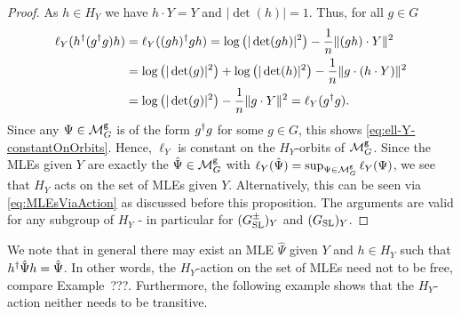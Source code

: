 \begin{proof}
	As $h \in H_Y$ we have $h \cdot Y = Y$ and $|\det(h)| = 1$. Thus, for all $g \in G$
	\begin{align*}
		\ell_Y(h^{\dagger}( g^{\dagger} g) h) &= \ell_{Y}((gh)^{\dagger} gh) = \log \big( |\det(gh)|^2 \big) - \frac{1}{n} \| (gh) \cdot Y \|^2 \\
		&= \log \big( |\det(g)|^2 \big) + \log \big( |\det(h)|^2 \big) - \frac{1}{n} \| g \cdot (h \cdot Y) \|^2 \\
		&= \log \big( |\det(g)|^2 \big) - \frac{1}{n} \| g \cdot Y \|^2 = \ell_{Y}(g^{\dagger} g).
	\end{align*}
	Since any $\Psi \in \mathcal{M}^{\mathtt{g}}_G$ is of the form $g^{\dagger} g$ for some $g \in G$, this shows \eqref{eq:ell-Y-constantOnOrbits}.
	Hence, $\ell_Y$ is constant on the $H_Y$-orbits of $\mathcal{M}^{\mathtt{g}}_G$. Since the MLEs given $Y$ are exactly the $\hat{\Psi} \in \mathcal{M}^{\mathtt{g}}_G$ with $\ell_{Y}(\hat{\Psi})  = \sup_{\Psi \in \mathcal{M}^{\mathtt{g}}_{G}} \ell_{Y}(\Psi)$, we see that $H_Y$ acts on the set of MLEs given $Y$. Alternatively, this can be seen via \eqref{eq:MLEsViaAction} as discussed before this proposition.
	The arguments are valid for any subgroup of $H_Y$ - in particular for $(G_{\operatorname{SL}}^{\pm})_Y$ and $(G_{\operatorname{SL}})_Y$.
\end{proof}

We note that in general there may exist an MLE $\hat{\Psi}$ given $Y$ and $h \in H_Y$ such that $h^{\dagger} \hat{\Psi} h = \hat{\Psi}$. In other words, the $H_Y$-action on the set of MLEs need not to be free, compare Example~???. %
Furthermore, the following example shows that the $H_Y$-action neither needs to be transitive.

